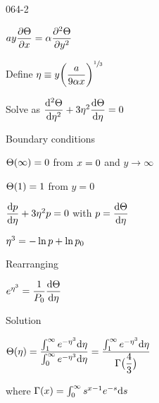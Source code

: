 \begin{mitframe}{064-2}
 \begin{listone}
	\item $\activity{y}\dfrac{\partial\dimltemp}{\partial\disp}=\tdiff\dfrac{\partial^2\dimltemp}{\partial{y}^2}$
    \item Define $\intrinsvisc\equiv{y}\bigg(\dfrac{\activity}{9\tdiff\disp}\bigg)^{\sfrac{1}{3}}$
    \item Solve as $\dfrac{\mathrm{d}^2\dimltemp}{\mathrm{d}\intrinsvisc^2}+3\intrinsvisc^2\dfrac{\mathrm{d}\dimltemp}{\mathrm{d}\intrinsvisc}=0$
    \item Boundary conditions
    	\begin{listthree}
        	\item $\dimltemp(\infty)=0$ from $\disp=0 $ and $y\rightarrow\infty$
            \item $\dimltemp(1)=1$ from $y=0$
        \end{listthree}
    \item $\dfrac{\mathrm{d}p}{\mathrm{d}\intrinsvisc}+3\intrinsvisc^2p=0$ with $p=\dfrac{\mathrm{d}\dimltemp}{\mathrm{d}\intrinsvisc}$
    \item $\intrinsvisc^3=-\ln{p}+\ln{p_{\init}}$
   \item Rearranging
   \item $\e^{\intrinsvisc^3}=\dfrac{1}{\p_{\init}}\dfrac{\mathrm{d}\dimltemp}{\mathrm{d}\intrinsvisc}$
    \item Solution
    \item $\dimltemp(\intrinsvisc)=\dfrac{\int_{1}^{\infty}\e^{-\intrinsvisc^{3}}\mathrm{d}\intrinsvisc}{\int_{\init}^{\infty}\e^{-\intrinsvisc^3}\mathrm{d}\intrinsvisc}=\dfrac{\int_{1}^{\infty}\e^{-\intrinsvisc^{3}}\mathrm{d}\intrinsvisc}{\Gamma\big(\small{\dfrac{4}{3}}\big)}$
    \item where $\Gamma(\disp)=\int_{\init}^{\infty}s^{\disp-1}\e^{-s}\mathrm{d}s$
    
\end{listone}       
\end{mitframe}